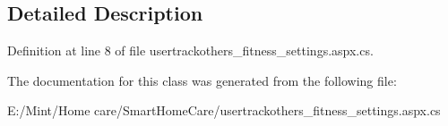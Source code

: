 \subsection{Detailed Description}


Definition at line 8 of file usertrackothers\-\_\-fitness\-\_\-settings.\-aspx.\-cs.



The documentation for this class was generated from the following file\-:\begin{DoxyCompactItemize}
\item 
E\-:/\-Mint/\-Home care/\-Smart\-Home\-Care/usertrackothers\-\_\-fitness\-\_\-settings.\-aspx.\-cs\end{DoxyCompactItemize}
